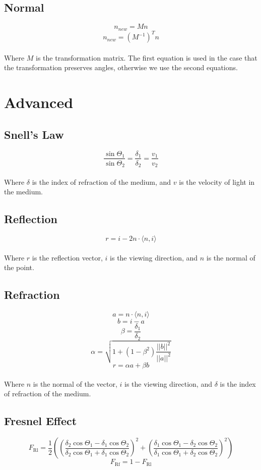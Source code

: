 \documentclass{article}
\begin{document}
\subsection{Normal}
\vspace{.3cm}
\[ n_{new} = Mn \]
\[ n_{new} = (M^{-1})^Tn \] \\
Where $M$ is the transformation matrix. The first equation is used in the case that the transformation preserves angles, otherwise we use the second equations.

\section{Advanced}
\subsection{Snell's Law}
\vspace{.3cm}
\[ \frac{\sin \Theta_1}{\sin \Theta_2} = \frac{\delta_1}{\delta_2} = \frac{v_1}{v_2} \] \\
Where $\delta$ is the index of refraction of the medium, and $v$ is the velocity of light in the medium.

\subsection{Reflection}
\vspace{.3cm}
\[ r = i - 2n \cdot \langle n, i \rangle \] \\
Where $r$ is the reflection vector, $i$ is the viewing direction, and $n$ is the normal of the point.

\subsection{Refraction}
\vspace{.3cm}
\[ a = n \cdot \langle n, i \rangle \]
\[ b = i - a \]
\[ \beta = \frac{\delta_1}{\delta_2} \]
\[ \alpha = \sqrt{1 + ( 1 - \beta^2) \frac{||b||^2}{||a||^2}} \]
\[ r = \alpha a + \beta b \] \\
Where $n$ is the normal of the vector, $i$ is the viewing direction, and $\delta$ is the index of refraction of the medium.

\subsection{Fresnel Effect}
\vspace{.3cm}
\[ F_{\text{Rl}} = \frac{1}{2} \left( \left( \frac{\delta_2 \cos\Theta_1 - \delta_1 \cos \Theta_2}{\delta_2 \cos\Theta_1 + \delta_1 \cos \Theta_2} \right)^2 + \left( \frac{\delta_1 \cos\Theta_1 - \delta_2 \cos \Theta_2}{\delta_1 \cos\Theta_1 + \delta_2 \cos \Theta_2} \right)^2 \right) \]
\[ F_{\text{Rf}} = 1 - F_{\text{Rl}} \]
\end{document}
